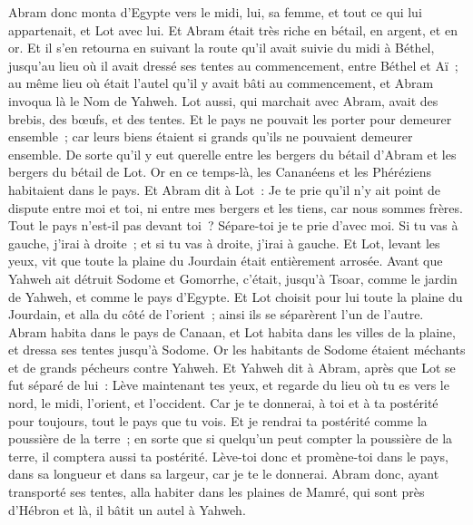 \begin{multicols}{2}
\VerseOne{}Abram donc monta d'Egypte vers le midi, lui, sa femme, et tout ce qui lui appartenait, et Lot avec lui.
Et Abram était très riche en bétail, en argent, et en or.
Et il s'en retourna en suivant la route qu'il avait suivie du midi à Béthel, jusqu'au lieu où il avait dressé ses tentes au commencement, entre Béthel et Aï~;
au même lieu où était l'autel qu'il y avait bâti au commencement, et Abram invoqua là le Nom de Yahweh.
Lot aussi, qui marchait avec Abram, avait des brebis, des bœufs, et des tentes.
Et le pays ne pouvait les porter pour demeurer ensemble~; car leurs biens étaient si grands qu'ils ne pouvaient demeurer ensemble.
De sorte qu'il y eut querelle entre les bergers du bétail d'Abram et les bergers du bétail de Lot. Or en ce temps-là, les Cananéens et les Phéréziens habitaient dans le pays.
Et Abram dit à Lot~: Je te prie qu'il n'y ait point de dispute entre moi et toi, ni entre mes bergers et les tiens, car nous sommes frères.
Tout le pays n'est-il pas devant toi~? Sépare-toi je te prie d'avec moi. Si tu vas à gauche, j'irai à droite~; et si tu vas à droite, j'irai à gauche.
Et Lot, levant les yeux, vit que toute la plaine du Jourdain était entièrement arrosée. Avant que Yahweh ait détruit Sodome et Gomorrhe, c'était, jusqu'à Tsoar, comme le jardin de Yahweh, et comme le pays d'Egypte.
Et Lot choisit pour lui toute la plaine du Jourdain, et alla du côté de l'orient~; ainsi ils se séparèrent l'un de l'autre.
Abram habita dans le pays de Canaan, et Lot habita dans les villes de la plaine, et dressa ses tentes jusqu'à Sodome.
Or les habitants de Sodome étaient méchants et de grands pécheurs contre Yahweh.
Et Yahweh dit à Abram, après que Lot se fut séparé de lui~: Lève maintenant tes yeux, et regarde du lieu où tu es vers le nord, le midi, l'orient, et l'occident.
Car je te donnerai, à toi et à ta postérité pour toujours, tout le pays que tu vois.
Et je rendrai ta postérité comme la poussière de la terre~; en sorte que si quelqu'un peut compter la poussière de la terre, il comptera aussi ta postérité.
Lève-toi donc et promène-toi dans le pays, dans sa longueur et dans sa largeur, car je te le donnerai.
Abram donc, ayant transporté ses tentes, alla habiter dans les plaines de Mamré, qui sont près d'Hébron et là, il bâtit un autel à Yahweh.

\end{multicols}
